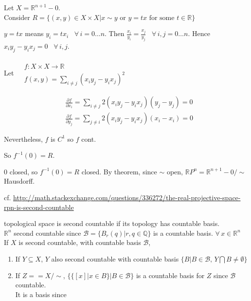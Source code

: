 \documentclass[11pt]{amsart}
\theoremstyle{definition}
\begin{document}
Let $X = \mathbb{R}^{n+1} -0$.  \\
Consider $R = \lbrace ( x,y) \in X \times X | x\sim y \text{ or } y = tx \text{ for some } t \in \mathbb{R} \rbrace$

$y = tx$ means $y_i = tx_i$ \, $\forall \, i = 0\dots n$.  Then $\frac{ x_i}{y_i} = \frac{ x_j}{ y_j}$ \, $\forall \, i,j = 0 \dots n$.  Hence $x_i y_j - y_i x_j = 0$ \, $\forall \, i , j$.

Let $\begin{aligned} & \quad \\
  & f : X \times X \to \mathbb{R} \\
  & f(x,y) = \sum_{ i \neq j} (x_i y_j - y_i x_j)^2 \end{aligned}$

\[
\begin{aligned}
  & \frac{ \partial f}{ \partial x_i} = \sum_{i \neq j } 2 (x_i y_j - y_i x_j) ( y_j - y_j) = 0 \\
  & \frac{ \partial f}{ \partial y_j} = \sum_{j \neq i } 2 (x_i y_j - y_i x_j) ( x_i - x_i) = 0
\end{aligned}
\]

Nevertheless, $f$ is $C^1$ so $f$ cont.

So $f^{-1}(0) = R$.

$0$ closed, so $f^{-1}(0) = R$ closed.  By theorem, since $\sim$ open, $\mathbb{R}P^n = \mathbb{R}^{n+1} - 0 / \sim$ Hausdorff.

cf. \url{http://math.stackexchange.com/questions/336272/the-real-projective-space-rpn-is-second-countable}

topological space is second countable if its topology has countable basis.  \\
\quad $\mathbb{R}^n$ second countable since $\mathcal{B} = \lbrace B_r{ ( q)} | r,q \in \mathbb{Q} \rbrace$ is a countable basis.  $\forall \, x \in \mathbb{R}^n$ \\

If $X$ is second countable, with countable basis $\mathcal{B}$,
\begin{enumerate}
\item If $Y \subseteq X$, $Y$ also second countable with countable basis $\lbrace B | B \in \mathcal{B}, \, Y \bigcap B \neq \emptyset \rbrace$
\item If $Z == X/\sim $, $\lbrace \lbrace [x] | x \in B \rbrace | B \in \mathcal{B} \rbrace$ is a countable basis for $Z$ since $\mathcal{B}$ countable.  \\

It is a basis since



\end{enumerate}
\end{document}
